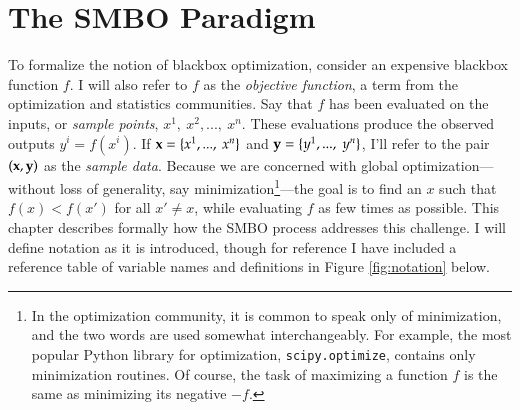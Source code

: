 \chapter{The SMBO Paradigm}\label{ch:smbo}

To formalize the notion of blackbox optimization, consider an expensive blackbox function $f$. I will also refer to $f$ as the \emph{objective function}, a term from the optimization and statistics communities. Say that $f$ has been evaluated on the inputs, or \emph{sample points}, $x^1,\ x^2, ... ,\ x^n$. These evaluations produce the observed outputs $y^i=f(x^i)$. If $\mathbf{x}=\{x^1, ... ,\ x^n\}$ and $\mathbf{y}=\{y^1, ...,\ y^n\}$, I'll refer to the pair $(\mathbf{x},\mathbf{y})$ as the \emph{sample data}. Because we are concerned with global optimization---without loss of generality, say minimization\footnote{In the optimization community, it is common to speak only of minimization, and the two words are used somewhat interchangeably. For example, the most popular Python library for optimization, \texttt{scipy.optimize}\cite{scipy_optimize}, contains only minimization routines. Of course, the task of maximizing a function $f$ is the same as minimizing its negative $-f$. }---the goal is to find an $x$ such that $f(x)<f(x')$ for all $x' \ne x$, while evaluating $f$ as few times as possible. This chapter describes formally how the SMBO process addresses this challenge. I will define notation as it is introduced, though for reference I have included a reference table of variable names and definitions in Figure \ref{fig:notation} below.

